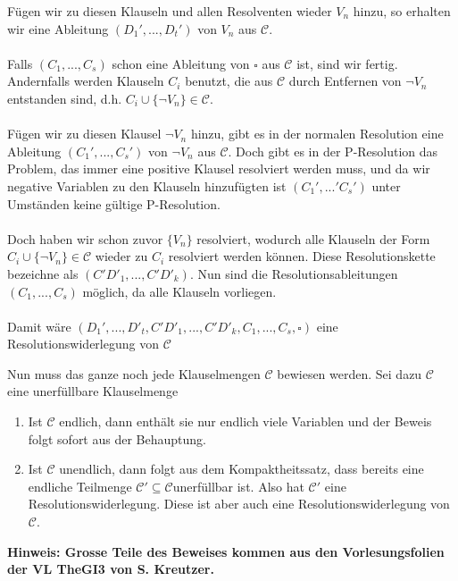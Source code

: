 \documentclass[a4paper,10pt]{article}
\begin{document}
\begin{itemize}
		Fügen wir zu diesen Klauseln und allen Resolventen wieder $V_n$ hinzu, so erhalten wir eine Ableitung $(D_1',...,D_t')$ von $V_n$ aus $\mathcal{C}$. \\
		 \ \\
		 Falls $(C_1,..., C_s)$ schon eine Ableitung von $\square$ aus $\mathcal{C}$ ist, sind wir fertig. Andernfalls werden Klauseln $C_i$ benutzt, die aus $\mathcal{C}$ durch Entfernen von $\lnot V_n$ entstanden sind, d.h. $C_i \cup \{\lnot V_n \} \in \mathcal{C}$. \\
		\ \\
		Fügen wir zu diesen Klausel $\lnot V_n$ hinzu, gibt es in der normalen Resolution eine Ableitung $(C_1',...,C_s')$ von $\lnot V_n$ aus $\mathcal{C}$. Doch gibt es in der P-Resolution das Problem, das immer eine positive Klausel resolviert werden muss, und da wir negative Variablen zu den Klauseln hinzufügten ist $(C_1',...'C_s')$ unter Umständen keine gültige P-Resolution. \\
		\ \\
		Doch haben wir schon zuvor $\{V_n \}$ resolviert, wodurch alle Klauseln der Form $C_i \cup \{\lnot V_n \} \in \mathcal{C}$ wieder zu $C_i$ resolviert werden können. Diese Resolutionskette bezeichne als $(C'D'_1,...,C'D'_k)$. Nun sind die Resolutionsableitungen $(C_1,..., C_s)$ möglich, da alle Klauseln vorliegen. \\
		\ \\
		Damit wäre $(D_1',...,D'_t,C'D'_1,...,C'D'_k,C_1,...,C_s,\square)$ eine Resolutionswiderlegung von $\mathcal{C}$ 
\end{itemize}
Nun muss das ganze noch jede Klauselmengen $\mathcal{C}$ bewiesen werden. Sei dazu $\mathcal{C}$ eine unerfüllbare Klauselmenge
\begin{enumerate}
	\item Ist $\mathcal{C}$ endlich, dann enthält sie nur endlich viele Variablen und der Beweis folgt sofort aus der Behauptung. 
	\item Ist $\mathcal{C}$ unendlich, dann folgt aus dem Kompaktheitssatz, dass bereits eine endliche Teilmenge $\mathcal{C}'\subseteq \mathcal{C} $unerfüllbar ist. Also hat $\mathcal{C}'$ eine Resolutionswiderlegung. Diese ist aber auch eine Resolutionswiderlegung von $\mathcal{C}$.

\end{enumerate}
\begin{center}\textbf{Hinweis: Grosse Teile des Beweises kommen aus den Vorlesungsfolien der VL TheGI3 von S. Kreutzer. }\end{center}
\end{document}
